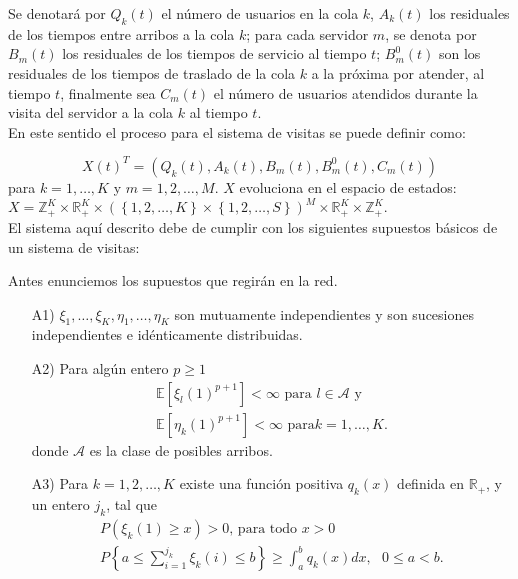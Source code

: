 \documentclass{article}
\newcommand{\ent}{\mathbb{Z}}
\newcommand{\rea}{\mathbb{R}}
\newcommand{\esp}{\mathbb{E}}
\numberwithin{equation}{section}
\begin{document}
Se denotar\'a por $Q_{k}\left(t\right)$ el n\'umero de usuarios en la cola $k$, $A_{k}\left(t\right)$ los residuales de los tiempos entre arribos a la cola $k$; para cada servidor $m$, se denota por $B_{m}\left(t\right)$ los residuales de los tiempos de servicio al tiempo $t$; $B_{m}^{0}\left(t\right)$ son los residuales de los tiempos de traslado de la cola $k$ a la pr\'oxima por atender, al tiempo $t$, finalmente sea $C_{m}\left(t\right)$ el n\'umero de usuarios atendidos durante la visita del servidor a la cola $k$ al tiempo $t$.\\

En este sentido el proceso para el sistema de visitas se puede definir como:

\begin{equation}\label{Esp.Edos.Down}
X\left(t\right)^{T}=\left(Q_{k}\left(t\right),A_{k}\left(t\right),B_{m}\left(t\right),B_{m}^{0}\left(t\right),C_{m}\left(t\right)\right)
\end{equation}
para $k=1,\ldots,K$ y $m=1,2,\ldots,M$. $X$ evoluciona en el espacio de estados: $X=\ent_{+}^{K}\times\rea_{+}^{K}\times\left(\left\{1,2,\ldots,K\right\}\times\left\{1,2,\ldots,S\right\}\right)^{M}\times\rea_{+}^{K}\times\ent_{+}^{K}$.\\

El sistema aqu\'i descrito debe de cumplir con los siguientes supuestos b\'asicos de un sistema de visitas:

Antes enunciemos los supuestos que regir\'an en la red.

\begin{itemize}
\item[A1)] $\xi_{1},\ldots,\xi_{K},\eta_{1},\ldots,\eta_{K}$ son mutuamente independientes y son sucesiones independientes e id\'enticamente distribuidas.

\item[A2)] Para alg\'un entero $p\geq1$
\begin{eqnarray*}
\esp\left[\xi_{l}\left(1\right)^{p+1}\right]<\infty\textrm{ para }l\in\mathcal{A}\textrm{ y }\\
\esp\left[\eta_{k}\left(1\right)^{p+1}\right]<\infty\textrm{ para
}k=1,\ldots,K.
\end{eqnarray*}
donde $\mathcal{A}$ es la clase de posibles arribos.

\item[A3)] Para $k=1,2,\ldots,K$ existe una funci\'on positiva $q_{k}\left(x\right)$ definida en $\rea_{+}$, y un entero $j_{k}$, tal que
\begin{eqnarray}
P\left(\xi_{k}\left(1\right)\geq x\right)>0\textrm{, para todo }x>0\\
P\left\{a\leq\sum_{i=1}^{j_{k}}\xi_{k}\left(i\right)\leq
b\right\}\geq\int_{a}^{b}q_{k}\left(x\right)dx, \textrm{ }0\leq
a<b.
\end{eqnarray}
\end{itemize}
\end{document}
